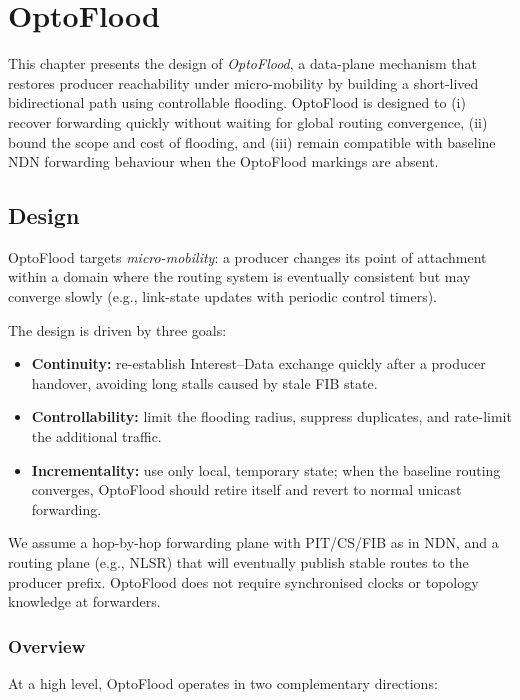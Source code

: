 \chapter{OptoFlood}
\label{c:optoflood}

This chapter presents the design of \emph{OptoFlood}, a data-plane mechanism that restores producer reachability under micro-mobility by building a short-lived bidirectional path using controllable flooding.
OptoFlood is designed to (i) recover forwarding quickly without waiting for global routing convergence, (ii) bound the scope and cost of flooding, and (iii) remain compatible with baseline NDN forwarding behaviour when the OptoFlood markings are absent.


\section{Design}
\label{sec:optoflood:design}

OptoFlood targets \emph{micro-mobility}: a producer changes its point of attachment within a domain where the routing system is eventually consistent but may converge slowly (e.g., link-state updates with periodic control timers).

The design is driven by three goals:

\begin{itemize}
  \item \textbf{Continuity:} re-establish Interest--Data exchange quickly after a producer handover, avoiding long stalls caused by stale FIB state.
  \item \textbf{Controllability:} limit the flooding radius, suppress duplicates, and rate-limit the additional traffic.
  \item \textbf{Incrementality:} use only local, temporary state; when the baseline routing converges, OptoFlood should retire itself and revert to normal unicast forwarding.
\end{itemize}

We assume a hop-by-hop forwarding plane with PIT/CS/FIB as in NDN, and a routing plane (e.g., NLSR) that will eventually publish stable routes to the producer prefix. OptoFlood does not require synchronised clocks or topology knowledge at forwarders.

\subsection{Overview}
At a high level, OptoFlood operates in two complementary directions:

